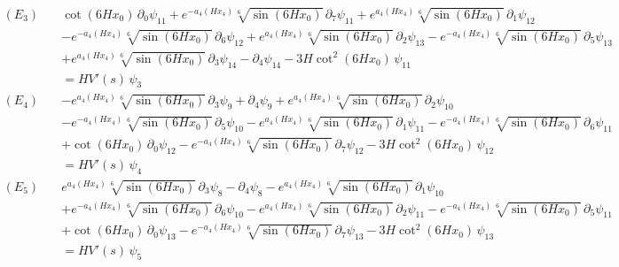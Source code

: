 \begin{align*}
(E_{3})\quad & \cot \left(6 H x_0\right)\,\partial_{0}\psi_{11} + e^{-a_4\left(H x_4\right)} \sqrt[6]{\sin \left(6 H x_0\right)}\,\partial_{7}\psi_{11} + e^{a_4\left(H x_4\right)} \sqrt[6]{\sin \left(6 H x_0\right)}\,\partial_{1}\psi_{12} \\
 &  - e^{-a_4\left(H x_4\right)} \sqrt[6]{\sin \left(6 H x_0\right)}\,\partial_{6}\psi_{12} + e^{a_4\left(H x_4\right)} \sqrt[6]{\sin \left(6 H x_0\right)}\,\partial_{2}\psi_{13} - e^{-a_4\left(H x_4\right)} \sqrt[6]{\sin \left(6 H x_0\right)}\,\partial_{5}\psi_{13} \\
 &  + e^{a_4\left(H x_4\right)} \sqrt[6]{\sin \left(6 H x_0\right)}\,\partial_{3}\psi_{14} - \partial_{4}\psi_{14} - 3 H \cot ^2\left(6 H x_0\right)\,\psi_{11} \\
 & = H V'(s)\,\psi_{3}
\end{align*}
\begin{align*}
(E_{4})\quad & -e^{a_4\left(H x_4\right)} \sqrt[6]{\sin \left(6 H x_0\right)}\,\partial_{3}\psi_{9} + \partial_{4}\psi_{9} + e^{a_4\left(H x_4\right)} \sqrt[6]{\sin \left(6 H x_0\right)}\,\partial_{2}\psi_{10} \\
 &  - e^{-a_4\left(H x_4\right)} \sqrt[6]{\sin \left(6 H x_0\right)}\,\partial_{5}\psi_{10} - e^{a_4\left(H x_4\right)} \sqrt[6]{\sin \left(6 H x_0\right)}\,\partial_{1}\psi_{11} - e^{-a_4\left(H x_4\right)} \sqrt[6]{\sin \left(6 H x_0\right)}\,\partial_{6}\psi_{11} \\
 &  + \cot \left(6 H x_0\right)\,\partial_{0}\psi_{12} - e^{-a_4\left(H x_4\right)} \sqrt[6]{\sin \left(6 H x_0\right)}\,\partial_{7}\psi_{12} - 3 H \cot ^2\left(6 H x_0\right)\,\psi_{12} \\
 & = H V'(s)\,\psi_{4}
\end{align*}
\begin{align*}
(E_{5})\quad & e^{a_4\left(H x_4\right)} \sqrt[6]{\sin \left(6 H x_0\right)}\,\partial_{3}\psi_{8} - \partial_{4}\psi_{8} - e^{a_4\left(H x_4\right)} \sqrt[6]{\sin \left(6 H x_0\right)}\,\partial_{1}\psi_{10} \\
 &  + e^{-a_4\left(H x_4\right)} \sqrt[6]{\sin \left(6 H x_0\right)}\,\partial_{6}\psi_{10} - e^{a_4\left(H x_4\right)} \sqrt[6]{\sin \left(6 H x_0\right)}\,\partial_{2}\psi_{11} - e^{-a_4\left(H x_4\right)} \sqrt[6]{\sin \left(6 H x_0\right)}\,\partial_{5}\psi_{11} \\
 &  + \cot \left(6 H x_0\right)\,\partial_{0}\psi_{13} - e^{-a_4\left(H x_4\right)} \sqrt[6]{\sin \left(6 H x_0\right)}\,\partial_{7}\psi_{13} - 3 H \cot ^2\left(6 H x_0\right)\,\psi_{13} \\
 & = H V'(s)\,\psi_{5}
\end{align*}
